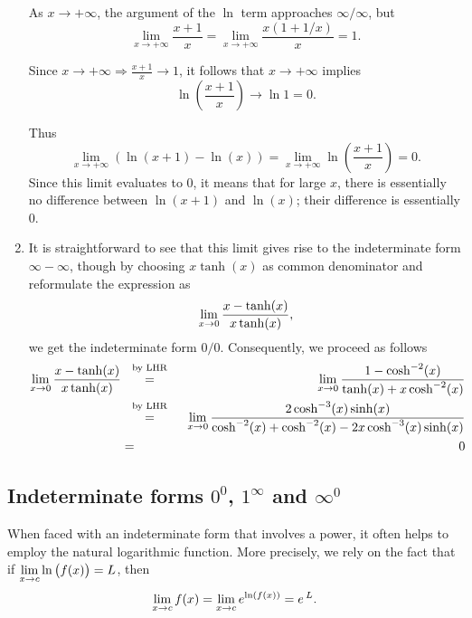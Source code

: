 \begin{example}
\begin{enumerate}
As $x\rightarrow+\infty$, the argument of the $\ln$ term approaches $\infty/\infty$, but
$$\lim_{x\to+\infty} \frac{x+1}x=\lim_{x\to+\infty} \frac{x(1+1/x)}x =1.$$

Since $x\rightarrow +\infty \Rightarrow \frac{x+1}x\rightarrow 1$, it follows that $x\rightarrow +\infty$ implies
$$ \ln\left(\frac{x+1}x\right)\rightarrow \ln 1=0.$$

Thus $$ \lim_{x\to+\infty}\left( \ln(x+1)-\ln (x)\right) = \lim_{x\to +\infty} \ln \left(\frac{x+1}x\right)=0.$$
Since this limit evaluates to 0, it means that for large $x$, there is essentially no difference between $\ln (x+1)$ and $\ln (x)$; their difference is essentially 0.
\ifanalysis\item It is straightforward to see that this limit gives rise to the indeterminate form $\infty-\infty$, though by choosing $x\tanh(x)$ as common denominator and reformulate the expression as
$$
\displaystyle \lim_{x\to0} \dfrac{x-\tanh(x)}{x\tanh(x)},
$$
we get the indeterminate form $0/0$. Consequently, we proceed as follows
\begin{eqnarray*}
\ds \lim_{x\to0} \dfrac{x-\tanh(x)}{x\tanh(x)}&\stackrel{\ \text{ by LHR \rule[-5pt]{0pt}{3pt}} \ }{=}&\ds \lim_{x\to0}\dfrac{1-\cosh^{-2}(x)}{\tanh(x)+x\cosh^{-2}(x)}\\
&\stackrel{\ \text{ by LHR \rule[-5pt]{0pt}{3pt}} \ }{=}&\ds \lim_{x\to0}\dfrac{2\cosh^{-3}(x)\sinh(x)}{\cosh^{-2}(x)+\cosh^{-2}(x)-2x\cosh^{-3}(x)\sinh(x)}\\
&=&0
\end{eqnarray*}
\fi
\end{enumerate}
\end{example}



\subsection{Indeterminate forms $0^0$, $1^\infty$ and $\infty^0$}

When faced with an indeterminate form that involves a power, it often helps to employ the natural logarithmic function. More precisely, we rely on the fact that if $\displaystyle \lim_{x\to c} \ln\big(f(x)\big) = L$, then 
$$\displaystyle \lim_{x\to c} f(x) = \lim_{x\to c} e^{\ln(f(x))} = e\,^L.$$ 



